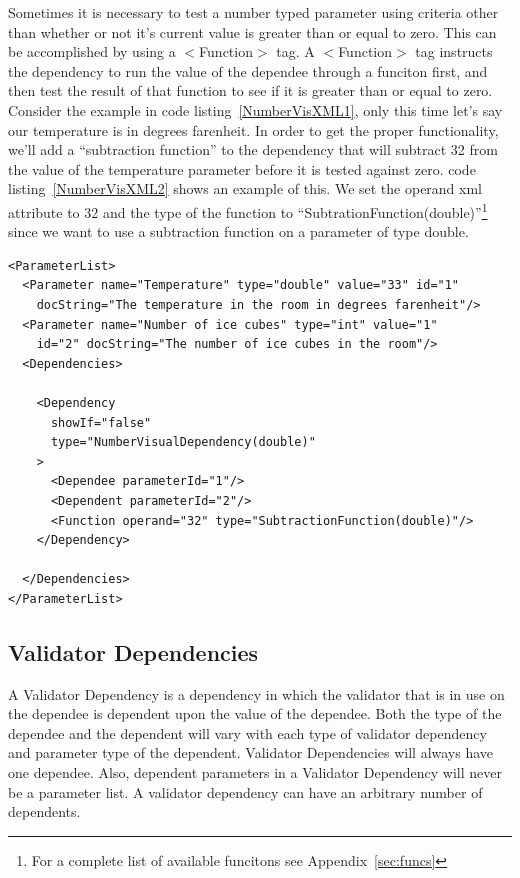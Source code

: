 Sometimes it is necessary to test a number typed parameter using criteria other than whether or not it's current value is greater than or equal to zero.
This can be accomplished by using a $<$Function$>$ tag. A $<$Function$>$ tag instructs the dependency to run the value of the dependee through a funciton
first, and then test the result of that function to see if it is greater than or equal to zero. Consider the example in code listing~\ref{NumberVisXML1}, only this
time let's say our temperature is in degrees farenheit. In order to get the proper functionality, we'll add a ``subtraction function'' to the dependency that will
subtract 32 from the value of the temperature parameter before it is tested against zero. code listing~\ref{NumberVisXML2} shows an example of this. We set the operand 
xml attribute to 32 and the type of the function to ``SubtrationFunction(double)''\footnote{For a complete list of available funcitons see Appendix~\ref{sec:funcs}}
 since we want to use a subtraction function on a parameter of type double.
\begin{lstlisting}[caption={Example usage of a Number Visual Dependency using a function}, label=NumberVisXML2]
<ParameterList>
  <Parameter name="Temperature" type="double" value="33" id="1" 
    docString="The temperature in the room in degrees farenheit"/>
  <Parameter name="Number of ice cubes" type="int" value="1"
    id="2" docString="The number of ice cubes in the room"/>
  <Dependencies>

    <Dependency 
      showIf="false" 
      type="NumberVisualDependency(double)"
    >
      <Dependee parameterId="1"/>
      <Dependent parameterId="2"/>
      <Function operand="32" type="SubtractionFunction(double)"/> 
    </Dependency>

  </Dependencies>
</ParameterList>
\end{lstlisting}

\subsection{Validator Dependencies}
A Validator Dependency is a dependency in which the validator that is in use on the dependee is dependent upon the value of the dependee. Both the type of
the dependee and the dependent will vary with each type of validator dependency and parameter type of the dependent. Validator Dependencies will always have
one dependee. Also, dependent parameters in a Validator Dependency will never be a parameter list. A validator dependency can have an arbitrary number of 
dependents.

